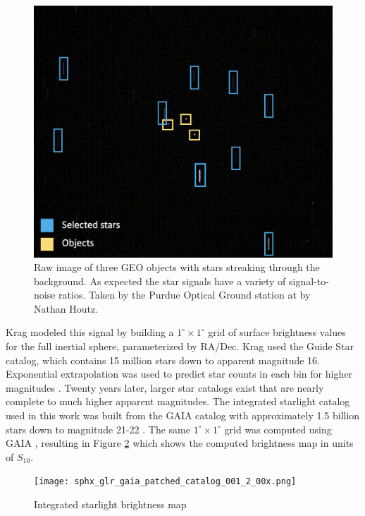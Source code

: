 \begin{figure}[ht]
  \centering
  \includegraphics[width=\figmed]{static_images/static_pogs_annotated.png}
  \caption{Raw image of three GEO objects with stars streaking through the background. As expected the star signals have a variety of signal-to-noise ratios. Taken by the Purdue Optical Ground station at \pogslla by Nathan Houtz.}
  \label{fig:pogs_observation_example}
\end{figure}

Krag \cite{krag2003} modeled this signal by building a $1^\circ \times 1^\circ$ grid of surface
brightness values for the full inertial sphere, parameterized by RA/Dec. Krag used the
Guide Star catalog, which contains 15 million stars down to apparent magnitude 16. Exponential extrapolation
was used to predict star counts in each bin for higher magnitudes \cite{krag2003}. Twenty years later, larger star catalogs exist that are nearly complete to much higher apparent magnitudes. The integrated
starlight catalog used in this work was built from the GAIA catalog with approximately 1.5 billion
stars down to magnitude 21-22 \cite{gaia_dr3}. The same $1^\circ \times 1^\circ$ grid was computed
using GAIA \cite{astroquery_gaia}, resulting in Figure
\ref{fig:gaiapatched} which shows the computed brightness map in units of $S_{10}$. 

\begin{figure}[ht]
  \centering
  \texttt{[image: sphx\_glr\_gaia\_patched\_catalog\_001\_2\_00x.png]}
  \caption{Integrated starlight brightness map}
  \label{fig:gaiapatched}
\end{figure}


